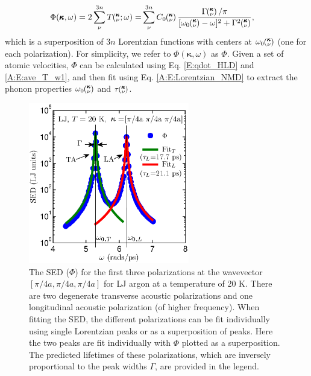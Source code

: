 \documentclass[letterpaper,12pt]{article}
\newcommand{\kvw}{\mspace{-4.0mu}\left(\mspace{-8.0mu}\begin{smallmatrix}&\pmb{\kappa} \\&\nu\end{smallmatrix}\mspace{-2.0mu};\omega\right)}
\newcommand{\kv}{\mspace{-4.0mu}\left(\mspace{-8.0mu}\begin{smallmatrix}&\pmb{\kappa} \\&\nu\end{smallmatrix}\mspace{-3.0mu}\right)}
\begin{document}
\begin{equation}\label{EQ:NMD-LorLorentzian_NMD}
\begin{split}
\Phi(\pmb{\kappa},\omega) = 2\sum_{\nu}^{3n} T\kvw =& \sum_{\nu}^{3n}C_0\kv\frac{\Gamma\kv/\pi}{[\omega_0\kv-\omega]^2+\Gamma^2\kv},
\end{split}
\end{equation}
which is a superposition of $3n$ Lorentzian functions with centers at $\omega_0\kv$ (one for each polarization). For simplicity, we refer to $\Phi(\pmb{\kappa},\omega)$ as $\Phi$. Given a set of atomic velocities, $\Phi$ can be calculated using Eq$.$ \eqref{E:qdot_HLD} and \eqref{A:E:ave_T_w1}, and then fit using Eq$.$ \eqref{A:E:Lorentzian_NMD} to extract the phonon properties $\omega_0\kv$ and $\tau\kv$.
\begin{figure}
\begin{center}
\includegraphics[angle=0,width=70.0mm]{LJ_FIT_PEAK.eps}
\vspace*{-5mm}
\end{center}
\caption{\label{FIG:LJ_FIT_PEAK} The SED ($\Phi$) for the first three polarizations at the wavevector $[\pi/4a,\pi/4a,\pi/4a]$ for LJ argon at a temperature of 20 K. There are two degenerate transverse acoustic polarizations and one longitudinal acoustic polarization (of higher frequency).\cite{dove1993} When fitting the SED, the different polarizations can be fit individually using single Lorentzian peaks or as a superposition of peaks. Here the two peaks are fit individually with $\Phi$ plotted as a superposition. The predicted lifetimes of these polarizations, which are inversely proportional to the peak widths $\Gamma$, are provided in the legend.}
\end{figure}
\end{document}
